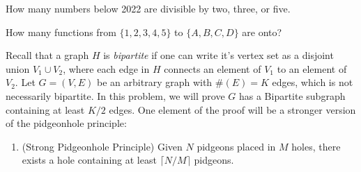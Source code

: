 \documentclass{exam}
\begin{document}
\begin{questions}
\question How many numbers below 2022 are divisible by two, three, or five.

\question How many functions from $\{ 1, 2, 3, 4, 5 \}$ to $\{ A ,B, C, D \}$ are onto?

\question Recall that a graph $H$ is \emph{bipartite} if one can write it's vertex set as a disjoint union $V_1 \cup V_2$, where each edge in $H$ connects an element of $V_1$ to an element of $V_2$. Let $G = (V,E)$ be an arbitrary graph with $\#(E) = K$ edges, which is not necessarily bipartite. In this problem, we will prove $G$ has a Bipartite subgraph containing at least $K/2$ edges. One element of the proof will be a stronger version of the pidgeonhole principle:
%
\begin{enumerate}
	\item[ ] (Strong Pidgeonhole Principle) Given $N$ pidgeons placed in $M$ holes, there exists a hole containing at least $\lceil N / M \rceil$ pidgeons.
\end{enumerate}

\end{questions}
\end{document}
